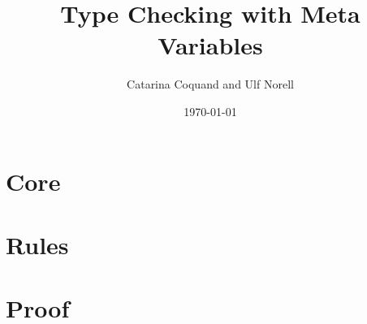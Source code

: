 \documentclass[11pt]{article}
\title{Type Checking with Meta Variables}
\author{Catarina Coquand and Ulf Norell}
\date{\today}
\begin{document}
\maketitle

\section{Core} 

\section{Rules} 

\section{Proof} 
\end{document}

